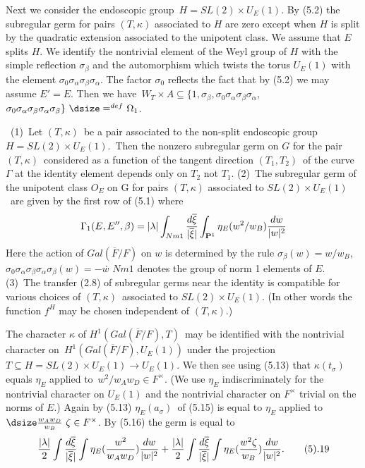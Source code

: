 Next we consider the endoscopic group\ $H = SL(2)\times U_{E}(1)$.  By (5.2) the subregular germ for pairs  $(T,\kappa)$
associated to  $H$  are zero except when  $H$  is split by the quadratic extension
associated to the unipotent class.  We assume that $E$ splits $H$.  We identify the
nontrivial element of the Weyl group of $H$  with the simple reflection  $\sigma_\beta$
and the automorphism which twists the torus  $U_{E}(1)$  with the element
$\sigma_0\sigma_\alpha \sigma_\beta \sigma_\alpha$.  The factor $\sigma_0$
reflects the fact that by (5.2) we may assume $E'=E$.  Then we have\ $W_T\times A
\subseteq \{ 1,\sigma_\beta, \sigma_0\sigma_\alpha \sigma_\beta \sigma_\alpha$,\
$\sigma_0\sigma_\alpha \sigma_\beta \sigma_\alpha \sigma_\beta\}~
{\dsize\mathrel{\mathop=^{def}}}~\Omega_1$.

\ (1)\ Let  $(T,\kappa)$\ be a pair associated to the
non-split endoscopic group\ $H=SL(2) \times U_{E}(1)$.\  Then the nonzero subregular
germ on $G$  for the pair  $(T,\kappa)$\  considered as a function of the tangent
direction  $(T_1,T_2)$\ of the curve $\Gamma$ at the identity element depends only on
$T_2$ not $T_1$.
\flushpar
(2)\ The subregular germ of the unipotent class $O_{E}$ on G for pairs  $(T,\kappa)$  associated to  $SL(2) 
\times U_{E}(1) $\  are given by the first row of (5.1)  where 
$$
\Gamma_1(E,E'',\beta) = |\lambda| \int_{Nm1} {\frac{d\overline{\xi}}{|\overline{\xi}|}}
\int_{{\bold P}^1} \eta_E(w^2/w_B) {\frac{dw}{|w|^2}}
$$
Here the action of $Gal(\overline{F}/F)$ on $w$ is determined by the rule
$\sigma_\beta(w) = w/w_B$,\ 
$\sigma_0\sigma_\alpha\sigma_\beta\sigma_\alpha\sigma_\beta(w) = -w$\. $Nm1$  
denotes the group of norm 1 elements of $E$.
\flushpar
(3)\ The transfer (2.8) of subregular germs near the identity is compatible for various choices of $(T,\kappa)$\
associated to  $SL(2) \times U_E(1)$.  (In other words the function $f^H$
may be chosen independent of $(T,\kappa)$.)
\endproclaim


  The character $\kappa$ of  $H^1(Gal(\overline{F}/F),T)$\  may be
identified with the nontrivial character on\ $H^1(Gal(\overline{F}/F), U_E(1))$
under the projection\ $T\subseteq H = SL(2) \times U_E(1) \to U_E(1)$.  We then
see using (5.13)  that  $\kappa(t_\sigma)$
equals $\eta_E$  applied to\ $w^2/w_Aw_D\in F^\times$.  (We use $\eta_E$
indiscriminately for the nontrivial character on  $U_E(1)$  and the nontrivial
character on  $F^\times$  trivial on the norms of  $E$.)  Again by (5.13)  
$\eta_E(a_\sigma)$\ of (5.15) is equal to  $\eta_E$  applied to 
${\dsize\frac{w_Aw_D}{w_B}}~ \zeta \in F^\times$.  By (5.16) the germ is equal to
$$
{\frac{|\lambda|}{2}} \int {\frac{d\overline{\xi}}{|\overline{\xi}|}} \int
\eta_E ({\frac{w^2}{w_Aw_D}}) {\frac{dw}{|w|^2}} + {\frac{|\lambda|}{2}} \int
{\frac{d\overline{\xi}}{|\overline{\xi}|}} \int \eta_E({\frac{w^2\zeta}{w_B}})
{\frac{dw}{|w|^2}} . \tag 5.19
$$


